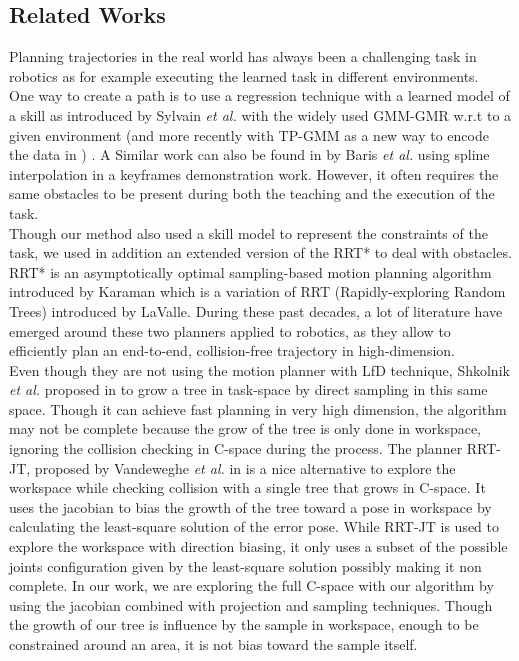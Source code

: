 \documentclass[letterpaper, 10 pt, conference]{ieeeconf}  %
\begin{document}
\subsection{Related Works}
Planning trajectories in the real world has always been a challenging task in robotics as for example executing the learned task in different environments.\\
 One way to create a path is to use a regression technique with a learned model of a skill as introduced by Sylvain \textit{et al.}  with the widely used GMM-GMR  w.r.t to a given environment \cite{SylvainLearningGeneralizing} (and more recently with TP-GMM as a new way to encode the data in \cite{Calinon15}) . A Similar work can also be found in \cite{refKeyframe1} by Baris \textit{et al.} using spline interpolation in a keyframes demonstration work. However, it often requires the same obstacles to be present during both the teaching and the execution of the task.\\
 Though our method also used a skill model to represent the constraints of the task, we used in addition an extended version of the RRT* to deal with obstacles. RRT* is an asymptotically optimal sampling-based motion planning algorithm introduced by Karaman \cite{KaramanRRTStar} which is a variation of RRT (Rapidly-exploring Random Trees)\cite{Lavalle98rapidly-exploringrandom} introduced by LaValle. During these past decades, a lot of literature have emerged around these two planners applied to robotics, as they allow to efficiently plan an end-to-end, collision-free trajectory in high-dimension.\\
Even though they are not using the motion planner with LfD technique, Shkolnik \textit{et al.} proposed in \cite{PathPlanningIn1000} to grow a tree in task-space by direct sampling in this same space. Though it can achieve fast planning in very high dimension, the algorithm may not be complete because the grow of the tree is only done in workspace, ignoring the collision checking in C-space during the process.  The planner RRT-JT, proposed by Vandeweghe \textit{et al.} in \cite{Vandeweghe_2007_5981} is a nice alternative to explore the workspace while checking collision with a single tree that grows in C-space. It uses the jacobian to bias the growth of the tree toward a pose in workspace by calculating the least-square solution of the error pose.
 While RRT-JT is used to explore the workspace with direction biasing, it only uses a subset of the possible joints configuration given by the least-square solution possibly making it non complete. In our work, we are exploring the full C-space with our algorithm by using the jacobian combined with projection and sampling techniques. Though the growth of our tree is influence by the sample in workspace, enough to be constrained around an area, it is not bias toward the sample itself. \\
\end{document}
